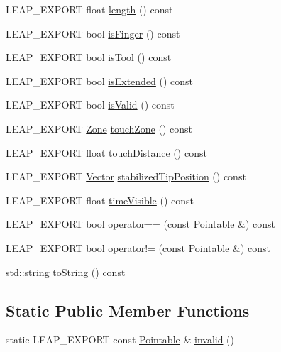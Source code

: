 \begin{DoxyCompactItemize}
L\+E\+A\+P\+\_\+\+E\+X\+P\+O\+RT float \hyperlink{class_leap_1_1_pointable_a07add87cda32c2ba106ab271416d26aa}{length} () const
\item 
L\+E\+A\+P\+\_\+\+E\+X\+P\+O\+RT bool \hyperlink{class_leap_1_1_pointable_a4631ae19c9389e638c69f462b5bae35a}{is\+Finger} () const
\item 
L\+E\+A\+P\+\_\+\+E\+X\+P\+O\+RT bool \hyperlink{class_leap_1_1_pointable_a3ad1f5ced8d852a0f35de68c4c559ef3}{is\+Tool} () const
\item 
L\+E\+A\+P\+\_\+\+E\+X\+P\+O\+RT bool \hyperlink{class_leap_1_1_pointable_aa59171cfd2c364bc9edc95e51ec1ffc1}{is\+Extended} () const
\item 
L\+E\+A\+P\+\_\+\+E\+X\+P\+O\+RT bool \hyperlink{class_leap_1_1_pointable_afe50d02eb1b4f554a4089c329fda1a45}{is\+Valid} () const
\item 
L\+E\+A\+P\+\_\+\+E\+X\+P\+O\+RT \hyperlink{class_leap_1_1_pointable_ad6e50b9878b8c1fdf899b5e09721deef}{Zone} \hyperlink{class_leap_1_1_pointable_acc5165280316d69ed18dd9ea99c410a7}{touch\+Zone} () const
\item 
L\+E\+A\+P\+\_\+\+E\+X\+P\+O\+RT float \hyperlink{class_leap_1_1_pointable_acf8554de21f3c475a39d12f8b2931e89}{touch\+Distance} () const
\item 
L\+E\+A\+P\+\_\+\+E\+X\+P\+O\+RT \hyperlink{struct_leap_1_1_vector}{Vector} \hyperlink{class_leap_1_1_pointable_a15bab44633dbee0ec54af03604e2b58b}{stabilized\+Tip\+Position} () const
\item 
L\+E\+A\+P\+\_\+\+E\+X\+P\+O\+RT float \hyperlink{class_leap_1_1_pointable_a306431a33ff18a40288c156f52d6f3c4}{time\+Visible} () const
\item 
L\+E\+A\+P\+\_\+\+E\+X\+P\+O\+RT bool \hyperlink{class_leap_1_1_pointable_a62b124c14981bbe4cff9961b0367feed}{operator==} (const \hyperlink{class_leap_1_1_pointable}{Pointable} \&) const
\item 
L\+E\+A\+P\+\_\+\+E\+X\+P\+O\+RT bool \hyperlink{class_leap_1_1_pointable_a8c5f5867979827b4649259a687c564c4}{operator!=} (const \hyperlink{class_leap_1_1_pointable}{Pointable} \&) const
\item 
std\+::string \hyperlink{class_leap_1_1_pointable_a846ad477711845f10853e7f3878a0c88}{to\+String} () const
\end{DoxyCompactItemize}
\subsection*{Static Public Member Functions}
\begin{DoxyCompactItemize}
\item 
static L\+E\+A\+P\+\_\+\+E\+X\+P\+O\+RT const \hyperlink{class_leap_1_1_pointable}{Pointable} \& \hyperlink{class_leap_1_1_pointable_a2d66e938c10bf54778fdfe5abf7dd77d}{invalid} ()
\end{DoxyCompactItemize}
